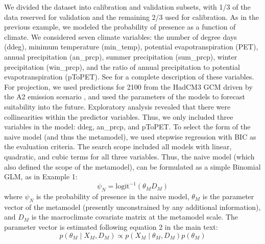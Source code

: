 \documentclass[11pt]{article}
\begin{document}
We divided the dataset into calibration and validation subsets, with 1/3 of the data reserved for validation and the remaining 2/3 used for calibration.
As in the previous example, we modeled the probability of presence as a function of climate.
We considered seven climate variables: the number of degree days (ddeg), minimum temperature (min\_temp), potential evapotranspiration (PET), annual precipitation (an\_prcp), summer precipitation (sum\_prcp), winter precipitation (win\_prcp), and the ratio of annual precipitation to potential evapotranspiration (pToPET).
See \citet{Morin2009} for a complete description of these variables.
For projection, we used predictions for 2100 from the HadCM3 GCM \citep{Pope2000} driven by the A2 emission scenario \citep{Nakicenovic2000}, and used the parameters of the models to forecast suitability into the future.
Exploratory analysis revealed that there were collinearities within the predictor variables.
Thus, we only included three variables in the model: ddeg, an\_prcp, and pToPET.
To select the form of the naive model (and thus the metamodel), we used stepwise regression with BIC as the evaluation criteria.
The search scope included all models with linear, quadratic, and cubic terms for all three variables.
Thus, the naive model (which also defined the scope of the metamodel), can be formulated as a simple Binomial GLM, as in Example 1:
\begin{equation}
\psi_N =\text{logit}^{-1}\left( \theta_M D_M \right)
\end{equation}
where \(\psi_N\) is the probability of presence in the naive model, \(\theta_M\) is the parameter vector of the metamodel (presently unconstrained by any additional information), and \(D_M\) is the macroclimate covariate matrix at the metamodel scale.
The parameter vector is estimated following equation 2 in the main text:
\begin{equation}
p\left (\theta_M \mid X_M,D_M \right ) \propto 
p \left(X_M \mid \theta_M, D_M \right)
p \left(\theta_M \right)
\end{equation}
\end{document}
